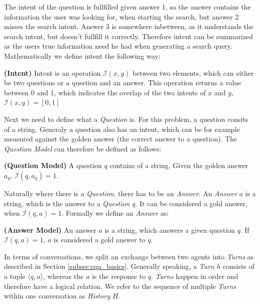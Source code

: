 The intent of the question is fullfilled given answer 1, so the answer contains the information the user was looking for, when starting the search, but answer 2 misses the search intent. Answer 3 is somewhere inbetween, as it understands the search intent, but doesn't fullfill it correctly. Therefore intent can be summarized as the users true information need he had when generating a search query. Mathematically we define intent the following way:

\begin{definition}
    \textbf{(Intent)} Intent is an operation $\mathcal{I}(x, y)$ between two elements, which can either be two questions or a question and an answer. This operation returns a value between 0 and 1, which indicates the overlap of the two intents of $x$ and $y$, $\mathcal{I}(x, y) = [0,1]$ 
    \label{def:intent}
\end{definition}

Next we need to define what a \textit{Question} is. For this problem, a question consits of a string. Generaly a question also has an intent, which can be for example measured against the golden answer (the correct answer to a question). The \textit{Question Model} can therefore be defined as follows:

\begin{definition}
    \textbf{(Question Model)} A question $q$ contains of a string. Given the golden answer $a_q$, $\mathcal{I}(q, a_q) = 1$.
    \label{def:question_model}
\end{definition}

Naturally where there is a \textit{Question}, there has to be an \textit{Answer}. An \textit{Answer} $a$ is a string, which is the answer to a \textit{Question} $q$. It can be considered a gold answer, when $\mathcal{I}(q,a) = 1$. Formally we define an \textit{Answer} as:

\begin{definition}
    \textbf{(Answer Model)} An answer $a$ is a string, which answers a given question $q$. If $\mathcal{I}(q,a) = 1$, $a$ is considered a gold answer to $q$.
    \label{def:answer_model}
\end{definition}

In terms of conversations, we split an exchange between two agents into \textit{Turns} as described in Section \ref{subsec:cqa_basics}. Generally speaking, a \textit{Turn} $h$ consists of a tuple $\langle q,a\rangle$, whereas the $a$ is the response to $q$. \textit{Turns} happen in order and therefore have a logical relation. We refer to the sequence of multiple \textit{Turns} within one conversation as \textit{History} $H$.

